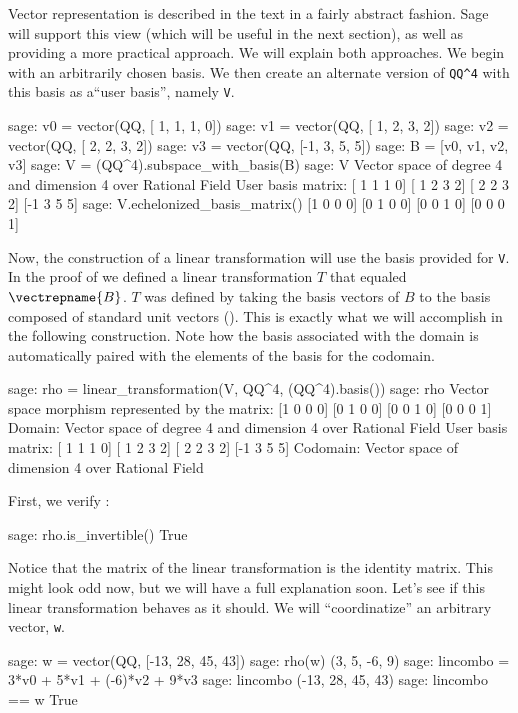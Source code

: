 Vector representation is described in the text in a fairly abstract fashion.  Sage will support this view (which will be useful in the next section), as well as providing a more practical approach.  We will explain both approaches.  We begin with an arbitrarily chosen basis.  We then create an alternate version of \verb?QQ^4? with this basis as a``user basis'', namely \verb?V?.
%
\begin{sageexample}
sage: v0 = vector(QQ, [ 1, 1, 1, 0])
sage: v1 = vector(QQ, [ 1, 2, 3, 2])
sage: v2 = vector(QQ, [ 2, 2, 3, 2])
sage: v3 = vector(QQ, [-1, 3, 5, 5])
sage: B = [v0, v1, v2, v3]
sage: V = (QQ^4).subspace_with_basis(B)
sage: V
Vector space of degree 4 and dimension 4 over Rational Field
User basis matrix:
[ 1  1  1  0]
[ 1  2  3  2]
[ 2  2  3  2]
[-1  3  5  5]
sage: V.echelonized_basis_matrix()
[1 0 0 0]
[0 1 0 0]
[0 0 1 0]
[0 0 0 1]
\end{sageexample}
%
Now, the construction of a linear transformation will use the basis provided for \verb?V?.  In the proof of  we defined a linear transformation $T$ that equaled $\vectrepname{B}$.  $T$ was defined by taking the basis vectors of $B$ to the basis composed of standard unit vectors ().  This is exactly what we will accomplish in the following construction.  Note how the basis associated with the domain is automatically paired with the elements of the basis for the codomain.
%
\begin{sageexample}
sage: rho = linear_transformation(V, QQ^4, (QQ^4).basis())
sage: rho
Vector space morphism represented by the matrix:
[1 0 0 0]
[0 1 0 0]
[0 0 1 0]
[0 0 0 1]
Domain: Vector space of degree 4 and dimension 4 over Rational Field
User basis matrix:
[ 1  1  1  0]
[ 1  2  3  2]
[ 2  2  3  2]
[-1  3  5  5]
Codomain: Vector space of dimension 4 over Rational Field
\end{sageexample}
%
First, we verify :
%
\begin{sageexample}
sage: rho.is_invertible()
True
\end{sageexample}
%
Notice that the matrix of the linear transformation is the identity matrix.  This might look odd now, but we will have a full explanation soon.  Let's see if this linear transformation behaves as it should.  We will ``coordinatize'' an arbitrary vector, \verb?w?.
%
\begin{sageexample}
sage: w = vector(QQ, [-13, 28, 45, 43])
sage: rho(w)
(3, 5, -6, 9)
sage: lincombo = 3*v0 + 5*v1 + (-6)*v2 + 9*v3
sage: lincombo
(-13, 28, 45, 43)
sage: lincombo == w
True
\end{sageexample}
